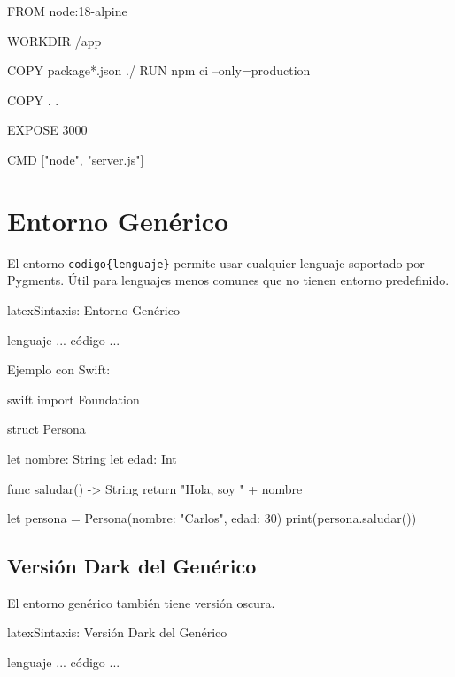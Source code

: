 \begin{dockercode}
FROM node:18-alpine

WORKDIR /app

COPY package*.json ./
RUN npm ci --only=production

COPY . .

EXPOSE 3000

CMD ["node", "server.js"]
\end{dockercode}

\section{Entorno Genérico}
\label{sec:generico}

El entorno \texttt{codigo\{lenguaje\}} permite usar cualquier lenguaje soportado
por Pygments. Útil para lenguajes menos comunes que no tienen entorno predefinido.

\begin{codigosimple}{latex}{Sintaxis: Entorno Genérico}
\begin{codigo}{lenguaje}
  ... código ...
\end{codigo}
\end{codigosimple}

Ejemplo con Swift:

\begin{codigo}{swift}
import Foundation

struct Persona {
    let nombre: String
    let edad: Int

    func saludar() -> String {
        return "Hola, soy " + nombre
    }
}

let persona = Persona(nombre: "Carlos", edad: 30)
print(persona.saludar())
\end{codigo}

\subsection{Versión Dark del Genérico}

El entorno genérico también tiene versión oscura.

\begin{codigosimple}{latex}{Sintaxis: Versión Dark del Genérico}
\begin{codigoDark}{lenguaje}
  ... código ...
\end{codigoDark}
\end{codigosimple}

